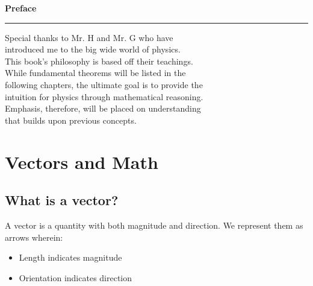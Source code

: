 \documentclass[a4paper, 11pt]{book}
\begin{document}
\clearpage
\thispagestyle{empty}
\begin{center}
	\vspace*{5cm}
	{\Huge\bfseries Preface}
	\vspace{1.0cm}

	\rule{0.5\linewidth}{0.4pt}

	\vspace{1.5cm}
	
	\begin{minipage}{0.8\textwidth}
		\Large\centering Special thanks to Mr. H and Mr. G who have 
		\\[0.2em] introduced me to the big wide world of physics.
		\\[0.2em] This book's philosophy is based off their teachings.
		\\[0.2em] While fundamental theorems will be listed in the  
		\\[0.2em] following chapters, the ultimate goal is to provide the 
		\\[0.2em] intuition for physics through mathematical reasoning. 
		\\[0.2em] Emphasis, therefore, will be placed on understanding 
		\\[0.2em] that builds upon previous concepts.
		
		
	\end{minipage}
\end{center}

\let\cleardoublepage\clearpage

\tableofcontents

\chapter{Vectors and Math}

\section{What is a vector?}
A vector is a quantity with both magnitude and direction. We represent them as arrows wherein:

\begin{itemize}
\item Length indicates magnitude
\item Orientation indicates direction
\end{itemize}
\end{document}
